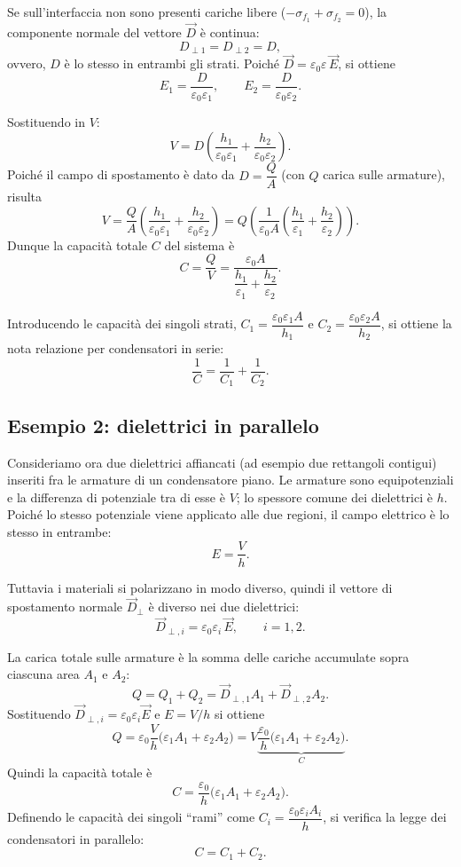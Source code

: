 \documentclass{book}
\begin{document}
Se sull'interfaccia non sono presenti cariche libere ($-\sigma_{{f}_{1}}+ \sigma_{{f}_{2}} = 0$), la componente normale del vettore \(\vec{D}\) è continua:
\[
D_{\perp1} = D_{\perp2} = D,
\]
ovvero, \(D\) è lo stesso in entrambi gli strati. Poiché \(\vec{D}=\varepsilon_0\varepsilon\,\vec{E}\), si ottiene
\[
E_1 = \frac{D}{\varepsilon_0\varepsilon_1},\qquad
E_2 = \frac{D}{\varepsilon_0\varepsilon_2}.
\]

Sostituendo in \(V\):
\[
V = D\left(\frac{h_1}{\varepsilon_0\varepsilon_1}+\frac{h_2}{\varepsilon_0\varepsilon_2}\right).
\]
Poiché il campo di spostamento è dato da \(D = \dfrac{Q}{A}\) (con \(Q\) carica sulle armature), risulta
\[
V = \frac{Q}{A}\left(\frac{h_1}{\varepsilon_0\varepsilon_1}+\frac{h_2}{\varepsilon_0\varepsilon_2}\right)
= Q\left(\frac{1}{\varepsilon_0 A}\left(\frac{h_1}{\varepsilon_1}+\frac{h_2}{\varepsilon_2}\right)\right).
\]
Dunque la capacità totale \(C\) del sistema è
\[
C=\frac{Q}{V}=\frac{\varepsilon_0 A}{\dfrac{h_1}{\varepsilon_1}+\dfrac{h_2}{\varepsilon_2}}.
\]

Introducendo le capacità dei singoli strati, \(C_1=\dfrac{\varepsilon_0\varepsilon_1 A}{h_1}\) e \(C_2=\dfrac{\varepsilon_0\varepsilon_2 A}{h_2}\), si ottiene la nota relazione per condensatori in serie:
\[
\frac{1}{C}=\frac{1}{C_1}+\frac{1}{C_2}.
\]

\subsection*{Esempio 2: dielettrici in parallelo}

Consideriamo ora due dielettrici affiancati (ad esempio due rettangoli contigui) inseriti fra le armature di un condensatore piano. Le armature sono equipotenziali e la differenza di potenziale tra di esse è \(V\); lo spessore comune dei dielettrici è \(h\). Poiché lo stesso potenziale viene applicato alle due regioni, il campo elettrico è lo stesso in entrambe:
\[
E=\frac{V}{h}.
\]

Tuttavia i materiali si polarizzano in modo diverso, quindi il vettore di spostamento normale \(\vec{D}_{\perp}\) è diverso nei due dielettrici:
\[
\vec{D}_{\perp,i}=\varepsilon_0\varepsilon_i\,\vec{E},\qquad i=1,2.
\]

La carica totale sulle armature è la somma delle cariche accumulate sopra ciascuna area \(A_1\) e \(A_2\):
\[
Q=Q_1+Q_2 = \vec{D}_{\perp,1}A_1 + \vec{D}_{\perp,2}A_2.
\]
Sostituendo \(\vec{D}_{\perp,i}=\varepsilon_0\varepsilon_i \vec{E}\) e \(E=V/h\) si ottiene
\[
Q = \varepsilon_0\frac{V}{h}\bigl(\varepsilon_1 A_1 + \varepsilon_2 A_2\bigr)
= V\underbrace{\frac{\varepsilon_0}{h}\bigl(\varepsilon_1 A_1 + \varepsilon_2 A_2\bigr)}_{C}.
\]
Quindi la capacità totale è
\[
C=\frac{\varepsilon_0}{h}\bigl(\varepsilon_1 A_1 + \varepsilon_2 A_2\bigr).
\]
Definendo le capacità dei singoli “rami” come \(C_i=\dfrac{\varepsilon_0\varepsilon_i A_i}{h}\), si verifica la legge dei condensatori in parallelo:
\[
C = C_1 + C_2.
\]
\end{document}
